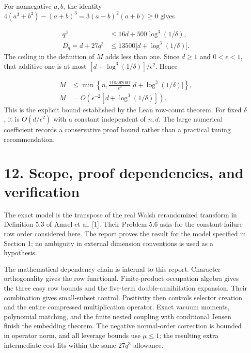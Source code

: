 \documentclass[11pt,a4paper]{article}
\begin{document}
For nonnegative \(a,b\), the identity \(4(a^3+b^3)-(a+b)^3=3(a-b)^2(a+b)\ge0\) gives

\begin{equation}
\begin{aligned}
q^3&\le16d+500\log^3(1/\delta),\\
D_q=d+27q^3&\le13500\big[d+\log^3(1/\delta)\big].
\end{aligned}
\tag{11.4}
\end{equation}
The ceiling in the definition of \(M\) adds less than one. Since \(d\ge1\) and \(0<\epsilon<1\), that additive one is at most \([d+\log^3(1/\delta)]/\epsilon^2\). Hence

\begin{equation}
\begin{aligned}
M&\le\min\left\{n,\frac{110592001}{\epsilon^2}
\big[d+\log^3(1/\delta)\big]\right\},\\
M&=O\!\left(\epsilon^{-2}[d+\log^3(1/\delta)]\right).
\end{aligned}
\tag{11.5}
\end{equation}
This is the explicit bound established by the Lean row-count theorem. For fixed \(\delta\), it is \(O(d/\epsilon^2)\) with a constant independent of \(n,d\). The large numerical coefficient records a conservative proof bound rather than a practical tuning recommendation.

\section*{12. Scope, proof dependencies, and verification}
The exact model is the transpose of the real Walsh rerandomized transform in Definition 5.3 of Amsel et al. [1]. Their Problem 5.6 asks for the constant-failure row order considered here. The report proves the result for the model specified in Section 1; no ambiguity in external dimension conventions is used as a hypothesis.

The mathematical dependency chain is internal to this report. Character orthogonality gives the row functional. Finite-product occupation algebra gives the three easy row bounds and the five-term double-annihilation expansion. Their combination gives small-subset control. Positivity then controls selector creation and the entire compressed multiplication operator. Exact vacuum moments, polynomial matching, and the finite nested coupling with conditional Jensen finish the embedding theorem. The negative normal-order correction is bounded in operator norm, and all leverage bounds use \(\mu\le1\); the resulting extra intermediate cost fits within the same \(27q^3\) allowance.
\end{document}
